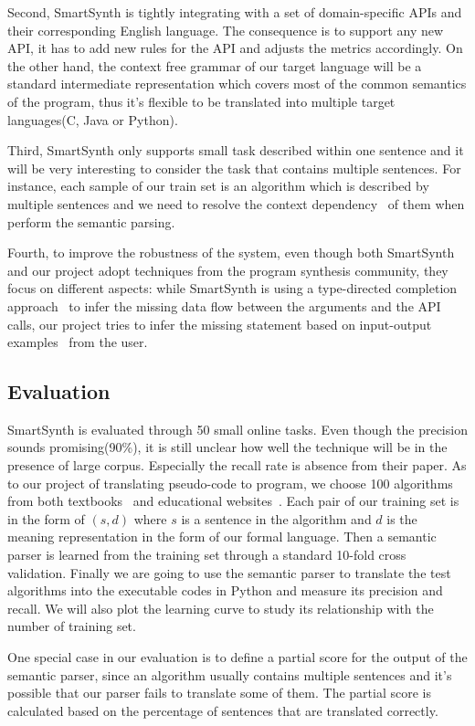 \documentclass[10pt]{article}
\begin{document}
Second, SmartSynth is tightly integrating with a set of domain-specific APIs and their
corresponding English language. The consequence is to support any new API, it has to 
add new rules for the API and adjusts the metrics accordingly. On the other hand, the 
context free grammar of our target language will be a standard intermediate 
representation which covers most of the common semantics of the program, thus it's 
flexible to be translated into multiple target languages(C, Java or Python).

Third, SmartSynth only supports small task described within one 
sentence and it will be very interesting to consider the task that contains multiple 
sentences. For instance, each sample of our train set is an algorithm which is
described by multiple sentences and we need to resolve the context 
dependency~\cite{dep} of them when perform the semantic parsing.

Fourth, to improve the robustness of the system, even though both SmartSynth 
and our project adopt techniques from the program synthesis community, 
they focus on different aspects: while SmartSynth is using a type-directed 
completion approach~\cite{typebase} to infer the missing data flow between
the arguments and the API calls, our project tries to infer the missing 
statement based on input-output examples~\cite{input} from the user.
\subsection{Evaluation}
SmartSynth is evaluated through 50 small online tasks. Even though 
the precision sounds promising(90\%), it is still unclear how well the 
technique will be in the presence of large corpus. Especially the recall
rate is absence from their paper. As to our project of translating pseudo-code to 
program, we choose 100 algorithms from both textbooks~\cite{taocp} and educational websites~\cite{codebat}. Each
pair of our training set is in the form of $(s,d)$ where $s$ is 
a sentence in the algorithm and $d$ is the meaning representation in the form 
of our formal language. Then a semantic parser is learned from the training
set through a standard 10-fold cross validation. Finally we are going to 
use the semantic parser to translate the test algorithms into the executable
codes in Python and measure its precision and recall. 
We will also plot the learning curve to study its relationship with 
the number of training set.  

One special case in our evaluation is to define a partial score for the output 
of the semantic parser, since an algorithm usually contains multiple sentences 
and it's possible that our parser fails to translate some of them. The partial
score is calculated based on the percentage of sentences that are translated
correctly.  
\end{document}
